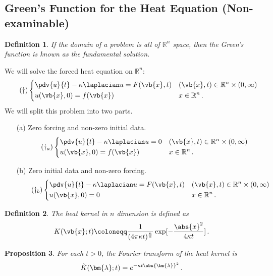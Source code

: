 \documentclass{article}
\theoremstyle{plain}\theoremheaderfont{\normalfont\itshape}\theorembodyfont{\rmfamily}\theoremseparator{.}\newtheorem*{rem}{Remark}\newtheorem*{ex}{Example}\newtheorem*{proof}{Proof}\newtheorem*{altp}{Alternative proof}
\theoremstyle{plain}\theoremheaderfont{\normalfont\bfseries}\theorembodyfont{\rmfamily}\theoremseparator{.}\newtheorem{thm}{Theorem}[section]\newtheorem{lem}[thm]{Lemma}\newtheorem{prop}[thm]{Proposition}\newtheorem*{cor}{Corollary}\newtheorem{defn}[thm]{Definition}\newtheorem{clm}[thm]{Claim}\newtheorem{clminproof}{Claim}
\theoremstyle{break}\theoremheaderfont{\normalfont\itshape}\theorembodyfont{\rmfamily}\theoremseparator{.\medskip}\newtheorem*{proofskip}{Proof}\newtheorem*{exs}{Examples}\newtheorem*{rems}{Remarks}
\theoremstyle{break}\theoremheaderfont{\normalfont\bfseries}\theorembodyfont{\rmfamily}\theoremseparator{.\medskip}\newtheorem{lemskip}[thm]{Lemma}\newtheorem{defnskip}[thm]{Definition}\newtheorem{propskip}[thm]{Proposition}\newtheorem{thmskip}[thm]{Theorem}
\numberwithin{equation}{section}
\newcommand{\bl}{\bm{\lambda}}
\begin{document}
	\subsection{Green's Function for the Heat Equation (Non-examinable)}
	\begin{defn}
		If the domain of a problem is all of \(\mathbb{R}^n\) space, then the Green's function is known as the \textit{fundamental solution}.
	\end{defn}
	We will solve the forced heat equation on \(\mathbb{R}^n\):
	\begin{equation}\tag{\(\dagger\)}
		\left\{\begin{aligned}
			&\pdv{u}{t}-\kappa\laplacian u=F(\vb{x},t) && (\vb{x},t)\in\mathbb{R}^n\times(0,\infty)\\
			&u(\vb{x},0)=f(\vb{x}) && x\in\mathbb{R}^n\,.
		\end{aligned}\right.
	\end{equation}
	We will split this problem into two parts.
	\begin{itemize}[topsep=0pt]
		\item[(a)] Zero forcing and non-zero initial data.
		\begin{equation}\tag{\(\dagger_a\)}
			\left\{\begin{aligned}
				&\pdv{u}{t}-\kappa\laplacian u=0 && (\vb{x},t)\in\mathbb{R}^n\times(0,\infty)\\
				&u(\vb{x},0)=f(\vb{x}) && x\in\mathbb{R}^n\,.
			\end{aligned}\right.
		\end{equation}
		\item[(b)] Zero initial data and non-zero forcing.
		\begin{equation}\tag{\(\dagger_b\)}
			\left\{\begin{aligned}
				&\pdv{u}{t}-\kappa\laplacian u=F(\vb{x},t) && (\vb{x},t)\in\mathbb{R}^n\times(0,\infty)\\
				&u(\vb{x},0)=0 && x\in\mathbb{R}^n\,.
			\end{aligned}\right.
		\end{equation}
	\end{itemize}
	\begin{defn}
		The \textit{heat kernel} in \(n\) dimension is defined as
		\[K(\vb{x};t)\coloneqq\frac{1}{(4\pi\kappa t)^\frac{n}{2}}\exp[-\frac{\abs{x}^2}{4\kappa t}]\,.\]
	\end{defn}
	\begin{prop}
		For each \(t>0\), the Fourier transform of the heat kernel is
		\[\tilde{K}(\bl;t)=e^{-\kappa t\abs{\bl}^2}\,.\]
	\end{prop}
\end{document}
